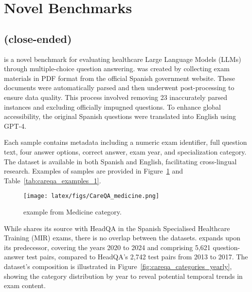 \section{Novel Benchmarks}\label{apx:novel}

\subsection{\careqa{} (close-ended)}\label{apx:careqa-close}

\careqa{} is a novel benchmark for evaluating healthcare Large Language Models (LLMs) through multiple-choice question answering. \careqa{} was created by collecting exam materials in PDF format from the official Spanish government website. These documents were automatically parsed and then underwent post-processing to ensure data quality. This process involved removing 23 inaccurately parsed instances and excluding officially impugned questions. To enhance global accessibility, the original Spanish questions were translated into English using GPT-4. %


Each \careqa{} sample contains metadata including a numeric exam identifier, full question text, four answer options, correct answer, exam year, and specialization category. The dataset is available in both Spanish and English, facilitating cross-lingual research. Examples of \careqa{} samples are provided in Figure~\ref{fig:careqa_example_1} and Table~\ref{tab:careqa_examples_1}.

\begin{figure}[h]
    \centering
    \texttt{[image: latex/figs/CareQA\_medicine.png]}
    \caption{\careqa{} example from Medicine category.}
    \label{fig:careqa_example_1}
    \vspace{10px}
\end{figure} 


While \careqa{} shares its source with HeadQA in the Spanish Specialised Healthcare Training (MIR) exams, there is no overlap between the datasets. \careqa{} expands upon its predecessor, covering the years 2020 to 2024 and comprising 5,621 question-answer test pairs, compared to HeadQA's 2,742 test pairs from 2013 to 2017.
The dataset's composition is illustrated in Figure~\ref{fig:careqa_categories_yearly}, showing the category distribution by year to reveal potential temporal trends in exam content.

